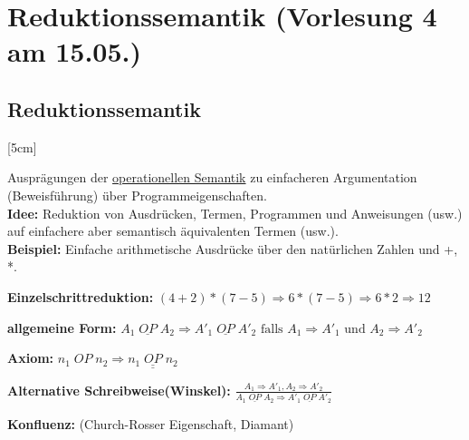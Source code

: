 \section{Reduktionssemantik \tiny(Vorlesung 4 am 15.05.)}
\subsection{Reduktionssemantik}
[5cm]

Ausprägungen der \underline{operationellen Semantik} zu einfacheren Argumentation (Beweisführung) über Programmeigenschaften.\\
\textbf{Idee:} Reduktion von Ausdrücken, Termen, Programmen und Anweisungen (usw.) auf einfachere aber semantisch äquivalenten Termen (usw.).\\
\textbf{Beispiel:} Einfache arithmetische Ausdrücke über den natürlichen Zahlen und +, *.
\begin{compactitem}
	\item[\textbf{Einzelschrittreduktion:}] $(4+2)*(7-5) \Rightarrow 6 * (7-5) \Rightarrow 6 * 2 \Rightarrow 12$
	\item[\textbf{allgemeine Form:}] $A_1\;\underline{OP}\;A_2 \Rightarrow A'_1\;\underline{OP}\;A'_2 \text{ falls } A_1 \Rightarrow A'_1 \text{ und } A_2 \Rightarrow A'_2$
	\item[\textbf{Axiom:}] $n_1\;OP\;n_2 \Rightarrow \underline{n_1\;\underline{OP}\;n_2}$
	\item[\textbf{Alternative Schreibweise(Winskel):}] $\frac {A_1 \Rightarrow A'_1, A_2 \Rightarrow A'_2} {A_1\;\underline{OP}\;A_2 \Rightarrow A'_1\;\underline{OP}\;A'_2}$
	\item[\textbf{Konfluenz:}] (Church-Rosser Eigenschaft, Diamant)\\
\end{compactitem}

